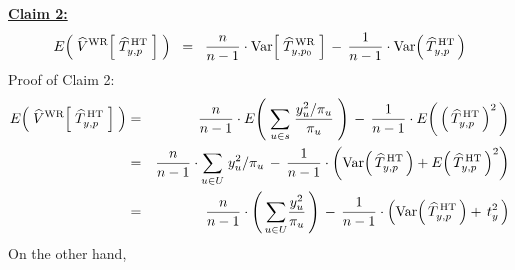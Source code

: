 \vskip 0.8cm
\noindent
\underline{\textbf{Claim 2:}}
\begin{equation*}
E\!\left(\;\widehat{V}^{\textnormal{WR}}\!\left[\;\widehat{T}^{\,\textnormal{HT}}_{y,p}\;\right]\;\right)
\;\; = \;\;
	\dfrac{n}{n-1} \cdot \textnormal{Var}\!\left[\;\widehat{T}^{\,\textnormal{WR}}_{y,p_{0}}\;\right]
	\,-\,
	\dfrac{1}{n-1} \cdot \textnormal{Var}\!\left(\,\widehat{T}^{\,\textnormal{HT}}_{y,p}\,\right)
\end{equation*}
Proof of Claim 2:
\begin{eqnarray*}
E\!\left(\;\widehat{V}^{\textnormal{WR}}\!\left[\;\widehat{T}^{\,\textnormal{HT}}_{y,p}\;\right]\;\right)
& = &
	\dfrac{n}{n-1} \cdot E\!\left(\;\underset{u \in s}{\sum}\;\dfrac{y_{u}^{2}/\pi_{u}}{\pi_{u}}\;\right)
	\,-\,
	\dfrac{1}{n-1} \cdot E\!\left(\,\left(\,\widehat{T}^{\,\textnormal{HT}}_{y,p}\,\right)^{2}\,\right)
\\
& = &
	\dfrac{n}{n-1} \cdot \underset{u \in U}{\sum}\;y_{u}^{2}/\pi_{u}
	\,-\,
	\dfrac{1}{n-1} \cdot
	\left(
		\textnormal{Var}\!\left(\,\widehat{T}^{\,\textnormal{HT}}_{y,p}\,\right)
		+
		E\!\left(\,\widehat{T}^{\,\textnormal{HT}}_{y,p}\,\right)^{2}
		\right)
\\
& = &
	\dfrac{n}{n-1} \cdot \left(\,\underset{u \in U}{\sum}\dfrac{y_{u}^{2}}{\pi_{u}}\,\right)
	\,-\,
	\dfrac{1}{n-1} \cdot
	\left(
		\textnormal{Var}\!\left(\,\widehat{T}^{\,\textnormal{HT}}_{y,p}\,\right)
		+\,
		t_{y}^{2}
		\,\right)
\end{eqnarray*}
On the other hand,

